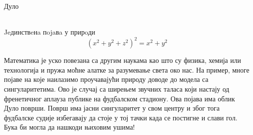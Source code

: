\documentclass[en]{./../../common/SurferDesc}%
\begin{document}
\footnotesize


\begin{surferPage}
  \begin{surferTitle}Дуло\end{surferTitle}  
  \\
Jeдинствeнa пojaвa у прирoди  \\
\smallskip
\[(x^2+ y^2+ z^2)^2	= x^2+ y^2\]

\singlespacing
Математика је уско повезана са другим наукама као што су  физика, хемија или технологија и пружа моћне алатке за разумевање света око нас. 
\singlespacing
На пример, многе појаве на које наилазимо проучавајући природу доводе до модела са сингуларитетима.
\singlespacing
Ово је случај са ширењем звучних таласа који настају од френетичног аплауза публике на фудбалском стадиону. Ова појава има облик Дуло површи. Површ има јасни сингуларитет у свом центру и због тога фудбалске судије избегавају да стоје у тој тачки када се постигне и слави гол. Бука би могла да нашкоди њиховим ушима! 


  \begin{surferText}
     \end{surferText}
\end{surferPage}
\end{document}
